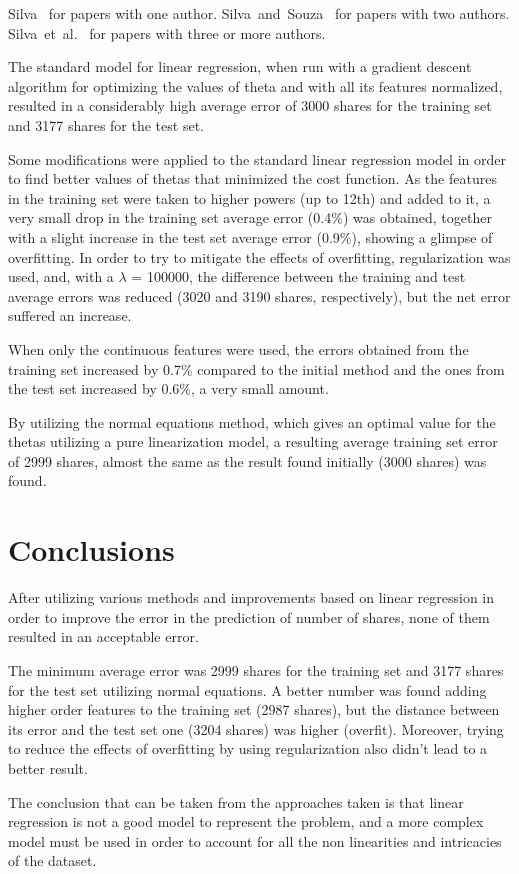 \documentclass[10pt,twocolumn,letterpaper]{article}
\newcommand{\CITEONE}[2]{\mbox{#1 \cite{#2}}}
\newcommand{\CITETWO}[3]{\mbox{#1 and #2 \cite{#3}}}
\newcommand{\CITEN}[2]{\mbox{#1 et al. \cite{#2}}}
\begin{document}
\CITEONE{Silva}{Silva_2010} for papers with one author.
\CITETWO{Silva}{Souza}{Silva_2010b} for papers with two authors.
\CITEN{Silva}{Silva_2010c} for papers with three or more authors.

The standard model for linear regression, when run with a gradient descent algorithm for optimizing the values of theta and with all its features normalized, resulted in a considerably high average error of 3000 shares for the training set and 3177 shares for the test set.

Some modifications were applied to the standard linear regression model in order to find better values of thetas that minimized the cost function. As the features in the training set were taken to higher powers (up to 12th) and added to it, a very small drop in the training set average error (0.4$\%$) was obtained, together with a slight increase in the test set average error (0.9$\%$), showing a glimpse of overfitting. In order to try to mitigate the effects of overfitting, regularization was used, and, with a $\lambda$ = 100000, the difference between the training and test average errors was reduced (3020 and 3190 shares, respectively), but the net error suffered an increase.

When only the continuous features were used, the errors obtained from the training set increased by 0.7$\%$ compared to the initial method and the ones from the test set increased by 0.6$\%$, a very small amount.

By utilizing the normal equations method, which gives an optimal value for the thetas utilizing a pure linearization model, a resulting average training set error of 2999 shares, almost the same as the result found initially (3000 shares) was found.

\section{Conclusions}

After utilizing various methods and improvements based on linear regression in order to improve the error in the prediction of number of shares, none of them resulted in an acceptable error. 

The minimum average error was 2999 shares for the training set and 3177 shares for the test set utilizing normal equations. A better number was found adding higher order features to the training set (2987 shares), but the distance between its error and the test set one (3204 shares) was higher (overfit). Moreover, trying to reduce the effects of overfitting by using regularization also didn't lead to a better result.

The conclusion that can be taken from the approaches taken is that linear regression is not a good model to represent the problem, and a more complex model must be used in order to account for all the non linearities and intricacies of the dataset.

{\small


}
\end{document}
